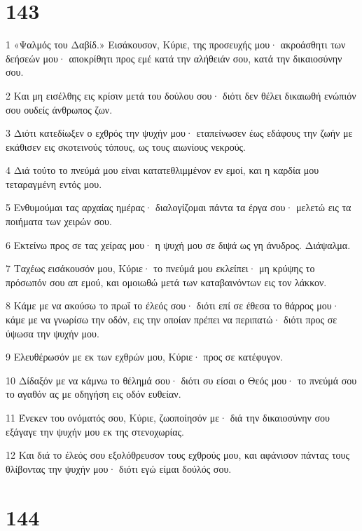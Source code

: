 \chapter{143}

\par 1 «Ψαλμός του Δαβίδ.» Εισάκουσον, Κύριε, της προσευχής μου· ακροάσθητι των δεήσεών μου· αποκρίθητι προς εμέ κατά την αλήθειάν σου, κατά την δικαιοσύνην σου.
\par 2 Και μη εισέλθης εις κρίσιν μετά του δούλου σου· διότι δεν θέλει δικαιωθή ενώπιόν σου ουδείς άνθρωπος ζων.
\par 3 Διότι κατεδίωξεν ο εχθρός την ψυχήν μου· εταπείνωσεν έως εδάφους την ζωήν με εκάθισεν εις σκοτεινούς τόπους, ως τους αιωνίους νεκρούς.
\par 4 Διά τούτο το πνεύμά μου είναι κατατεθλιμμένον εν εμοί, και η καρδία μου τεταραγμένη εντός μου.
\par 5 Ενθυμούμαι τας αρχαίας ημέρας· διαλογίζομαι πάντα τα έργα σου· μελετώ εις τα ποιήματα των χειρών σου.
\par 6 Εκτείνω προς σε τας χείρας μου· η ψυχή μου σε διψά ως γη άνυδρος. Διάψαλμα.
\par 7 Ταχέως εισάκουσόν μου, Κύριε· το πνεύμά μου εκλείπει· μη κρύψης το πρόσωπόν σου απ εμού, και ομοιωθώ μετά των καταβαινόντων εις τον λάκκον.
\par 8 Κάμε με να ακούσω το πρωΐ το έλεός σου· διότι επί σε έθεσα το θάρρος μου· κάμε με να γνωρίσω την οδόν, εις την οποίαν πρέπει να περιπατώ· διότι προς σε ύψωσα την ψυχήν μου.
\par 9 Ελευθέρωσόν με εκ των εχθρών μου, Κύριε· προς σε κατέφυγον.
\par 10 Δίδαξόν με να κάμνω το θέλημά σου· διότι συ είσαι ο Θεός μου· το πνεύμά σου το αγαθόν ας με οδηγήση εις οδόν ευθείαν.
\par 11 Ένεκεν του ονόματός σου, Κύριε, ζωοποίησόν με· διά την δικαιοσύνην σου εξάγαγε την ψυχήν μου εκ της στενοχωρίας.
\par 12 Και διά το έλεός σου εξολόθρευσον τους εχθρούς μου, και αφάνισον πάντας τους θλίβοντας την ψυχήν μου· διότι εγώ είμαι δούλός σου.

\chapter{144}


